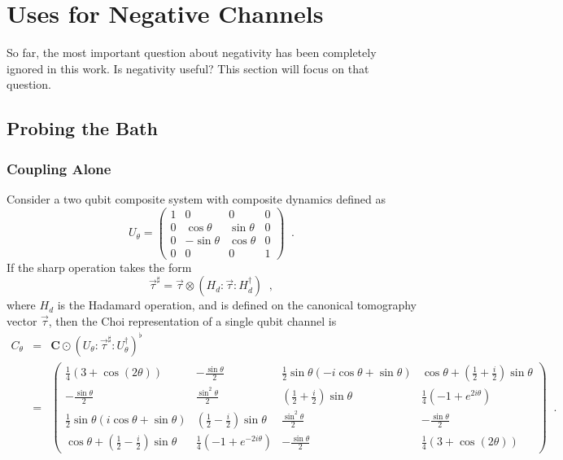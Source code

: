 \section{Uses for Negative Channels}

So far, the most important question about negativity has been completely ignored in this work.  Is negativity useful?  This section will focus on that question.

\subsection{Probing the Bath}
\subsubsection{Coupling Alone}
\label{sec:couplingalone}
Consider a two qubit composite system with composite dynamics defined as
$$
U_\theta = \begin{pmatrix}
1&0&0&0\\
0&\cos\theta&\sin\theta&0\\
0&-\sin\theta&\cos\theta&0\\
0&0&0&1
\end{pmatrix}\;\;.
$$
If the sharp operation takes the form
$$
\vec{\tau}^\sharp = \vec{\tau}\otimes\left(H_d:\vec{\tau}: H_d^\dagger\right)\;\;,
$$
where $H_d$ is the Hadamard operation, and is defined on the canonical tomography vector $\vec{\tau}$, then the Choi representation of a single qubit channel is
\begin{eqnarray*}
C_\theta &=& \mathbf{C}\odot \left(U_\theta:\vec{\tau}^\sharp :U_\theta^\dagger\right)^\flat\\
&=& \begin{pmatrix}
 \frac{1}{4} (3+\cos\left(2 \theta\right)) & -\frac{\sin\theta}{2} & \frac{1}{2} \sin\theta (-i \cos\theta+\sin\theta) & \cos\theta+\left(\frac{1}{2}+\frac{i}{2}\right) \sin\theta \\
 -\frac{\sin\theta}{2} & \frac{\sin^2\theta}{2} & \left(\frac{1}{2}+\frac{i}{2}\right) \sin\theta & \frac{1}{4} \left(-1+e^{2 i \theta}\right) \\
 \frac{1}{2} \sin\theta (i \cos\theta+\sin\theta) & \left(\frac{1}{2}-\frac{i}{2}\right) \sin\theta & \frac{\sin^2\theta}{2} & -\frac{\sin\theta}{2} \\
 \cos\theta+\left(\frac{1}{2}-\frac{i}{2}\right) \sin\theta & \frac{1}{4} \left(-1+e^{-2 i \theta}\right) & -\frac{\sin\theta}{2} & \frac{1}{4} (3+\cos\left(2 \theta\right))
\end{pmatrix}\;\;.
\end{eqnarray*}
